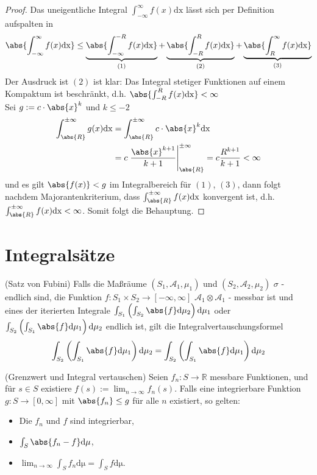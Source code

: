 \begin{proof}
	Das uneigentliche Integral $\int_{-\infty}^{\infty} f(x) \mathrm{dx}$ lässt sich per Definition aufspalten in 
	\begin{align}
		\abs{\int_{-\infty}^{\infty} f(x)\mathrm{dx}} \leq \underbrace{\abs{\int_{-\infty}^{-R}f(x) \mathrm{dx}}}_{(1)} + \underbrace{\abs{\int_{-R}^{R} f(x) \mathrm{dx}}}_{(2)} + \underbrace{\abs{\int_{R}^{\infty} f(x) \mathrm{dx}}}_{(3)}
	\end{align}
	Der Ausdruck ist $(2)$ ist klar: Das Integral stetiger Funktionen auf einem Kompaktum ist beschränkt, d.h. $\abs{\int_{-R}^{R} f(x) \mathrm{dx}} < \infty$ \\ 
	Sei $g:=c \cdot \abs{x}^k$ und $k \leq -2$ 
	\begin{align}
	\int_{\abs{R}}^{\pm \infty} g(x)\mathrm{dx} &= \int_{\abs{R}}^{\pm \infty} c \cdot \abs{x}^k \mathrm{dx} \\
	&= c \left. \frac{\abs{x}^{k+1}}{k+1}\right\rvert_{\abs{R}}^{\pm \infty} = c \frac{R^{k+1}}{k+1} < \infty
	\end{align}
	und es gilt $\abs{f(x)} < g$ im Integralbereich für $(1)$, $(3)$, dann folgt nachdem Majorantenkriterium, dass $\int_{\abs{R}}^{\pm \infty} f(x)\mathrm{dx}$ konvergent ist, d.h. $\int_{\abs{R}}^{\pm \infty} f(x)\mathrm{dx} < \infty$. Somit folgt die Behauptung.
\end{proof}
\section{Integralsätze}
\begin{satz}(Satz von Fubini)\label{a:fubini}
Falls die Maßräume $(S_1, \mathscr{A}_1, \mu_1)$ und $(S_2, \mathscr{A}_2, \mu_2)$ $\sigma$ - endlich sind, die Funktion $f: S_1 \times S_2 \rightarrow [-\infty, \infty]$ $\mathscr{A}_1 \otimes \mathscr{A}_1$ - messbar ist und eines der iterierten Integrale $\int_{S_1} \left( \int_{S_2} \abs{f} \mathrm{d\mu_2} \right) \mathrm{d\mu_1}$ oder $\int_{S_2} \left( \int_{S_1} \abs{f} \mathrm{d\mu_1} \right) \mathrm{d\mu_2}$ endlich ist, gilt die Integralvertauschungsformel
\begin{align}
	\int_{S_2} \left( \int_{S_1} \abs{f} \mathrm{d\mu_1} \right) \mathrm{d\mu_2} = \int_{S_2} \left( \int_{S_1} \abs{f} \mathrm{d\mu_1} \right) \mathrm{d\mu_2} 
\end{align}
\end{satz} \cite[Seite 258]{Werner2006}
\begin{satz}(Grenzwert und Integral vertauschen) \label{a:change}
Seien $f_n: S \rightarrow \mathbb{R}$ messbare Funktionen, und für $s \in S$ existiere $f(s) := \lim_{n \rightarrow \infty }{f_n(s)}$. Falls eine integrierbare Funktion $g: S \rightarrow [0, \infty]$ mit $\abs{f_n} \leq g$ für alle $n$ existiert, so gelten:
\begin{itemize}
	\item Die $f_n$ und $f$ sind integrierbar,
	\item $\int_S \abs{f_n - f} \mathrm{d\mu}$,
	\item $\lim_{n \rightarrow \infty}{ \int_S f_n \mathrm{d\mu}} = \int_S f \mathrm{d\mu}$.	
\end{itemize}
\end{satz} \cite[Seite 241]{Werner2006}
